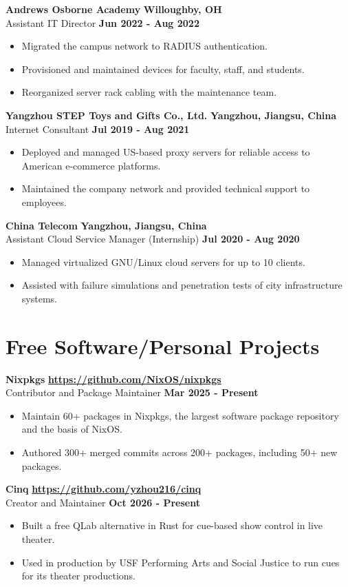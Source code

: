 \documentclass[letterpaper]{article}
\newenvironment{entry}[4]{%
  \textbf{#1} \hfill \textbf{#2} \\
  #3 \hfill \textbf{#4}
  \begin{itemize}
}{%
  \end{itemize}
  \medskip
}
\begin{document}
\begin{entry}{Andrews Osborne Academy}{Willoughby, OH}
  {Assistant IT Director}{Jun 2022 - Aug 2022}
  \item Migrated the campus network to RADIUS authentication.
  \item Provisioned and maintained devices for faculty, staff, and students.
  \item Reorganized server rack cabling with the maintenance team.
\end{entry}

\begin{entry}{Yangzhou STEP Toys and Gifts Co., Ltd.}{Yangzhou, Jiangsu, China}
  {Internet Consultant}{Jul 2019 - Aug 2021}
  \item Deployed and managed US-based proxy servers for reliable access to
    American e-commerce platforms.
  \item Maintained the company network and provided technical support to
    employees.
\end{entry}

\begin{entry}{China Telecom}{Yangzhou, Jiangsu, China}
  {Assistant Cloud Service Manager (Internship)}{Jul 2020 - Aug 2020}
  \item Managed virtualized GNU/Linux cloud servers for up to 10 clients.
  \item Assisted with failure simulations and penetration tests of city
    infrastructure systems.
\end{entry}

\section*{Free Software/Personal Projects}

\begin{entry}{Nixpkgs}{\url{https://github.com/NixOS/nixpkgs}}
  {Contributor and Package Maintainer}{Mar 2025 - Present}
  \item Maintain 60+ packages in Nixpkgs, the largest software package
    repository and the basis of NixOS.
  \item Authored 300+ merged commits across 200+ packages, including 50+ new
    packages.
\end{entry}

\begin{entry}{Cinq}{\url{https://github.com/yzhou216/cinq}}
  {Creator and Maintainer}{Oct 2026 - Present}
  \item Built a free QLab alternative in Rust for cue-based show control in
    live theater.
  \item Used in production by USF Performing Arts and Social Justice to run
    cues for its theater productions.
\end{entry}
\end{document}
